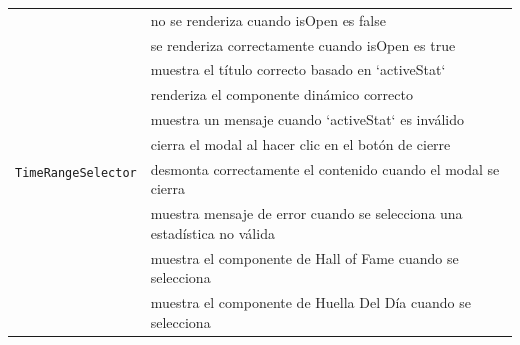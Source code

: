 \begin{longtable}{|p{5cm}|p{9cm}|}
  \multirow{10}{*}{\texttt{TimeRangeSelector}}    & no se renderiza cuando isOpen es false                                       \\ \cline{2-2}
                                                  & se renderiza correctamente cuando isOpen es true                             \\ \cline{2-2}
                                                  & muestra el título correcto basado en `activeStat`                            \\ \cline{2-2}
                                                  & renderiza el componente dinámico correcto                                    \\ \cline{2-2}
                                                  & muestra un mensaje cuando `activeStat` es inválido                           \\ \cline{2-2}
                                                  & cierra el modal al hacer clic en el botón de cierre                          \\ \cline{2-2}
                                                  & desmonta correctamente el contenido cuando el modal se cierra                \\ \cline{2-2}
                                                  & muestra mensaje de error cuando se selecciona una estadística no válida      \\ \cline{2-2}
                                                  & muestra el componente de Hall of Fame cuando se selecciona                   \\ \cline{2-2}
                                                  & muestra el componente de Huella Del Día cuando se selecciona                 \\ \hline


\end{longtable}
